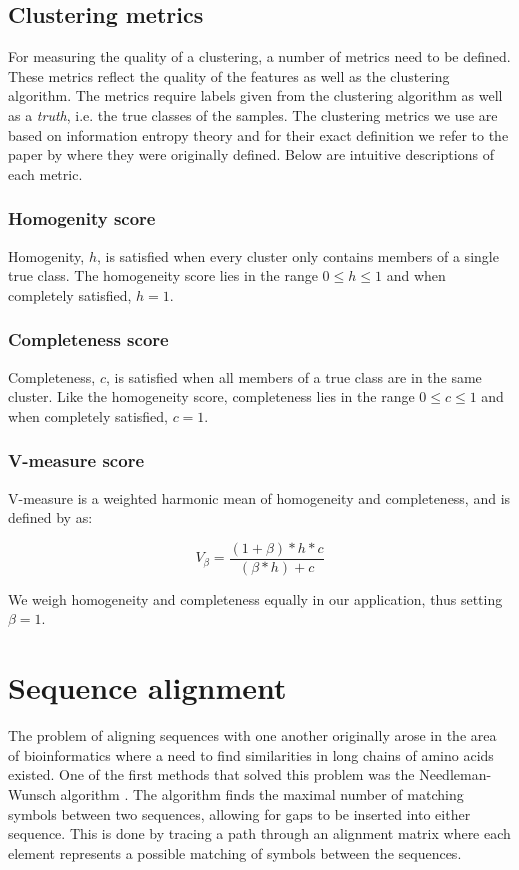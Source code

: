 \documentclass[a4paper]{report}
\begin{document}
\subsection{Clustering metrics}
\label{sec:metrics}
For measuring the quality of a clustering, a number of metrics need to be
defined. These metrics reflect the quality of the features as well as the
clustering algorithm. The metrics require labels given from the clustering
algorithm as well as a \emph{truth}, i.e. the true classes of the samples.
The clustering metrics we use are based on information entropy theory and
for their exact definition we refer to the paper by \citet{rosenberg07}
where they were originally defined. Below are intuitive descriptions of
each metric.

\subsubsection{Homogenity score}
Homogenity, $h$, is satisfied when every cluster only contains members of a
single true class. The homogeneity score lies in the range $0 \le h \le 1$ and
when completely satisfied, $h = 1$.

\subsubsection{Completeness score}
Completeness, $c$, is satisfied when all members of a true class are in the
same cluster. Like the homogeneity score, completeness lies in the range
$0 \le c \le 1$ and when completely satisfied, $c = 1$.

\subsubsection{V-measure score}
V-measure is a weighted harmonic mean of homogeneity and completeness, and
is defined by \citeauthor{rosenberg07} as:

\[
    V_{\beta} = \frac{(1 + \beta) * h * c}{(\beta * h) + c}
\]

We weigh homogeneity and completeness equally in our application, thus setting
$\beta = 1$.

\section{Sequence alignment}
The problem of aligning sequences with one another originally arose in the area
of bioinformatics where a need to find similarities in long chains of amino
acids existed. One of the first methods that solved this problem was the
Needleman-Wunsch algorithm \citep{needleman70}. The algorithm finds the maximal
number of matching symbols between two sequences, allowing for gaps to be
inserted into either sequence. This is done by tracing a path through an
alignment matrix where each element represents a possible matching of symbols
between the sequences.
\end{document}
